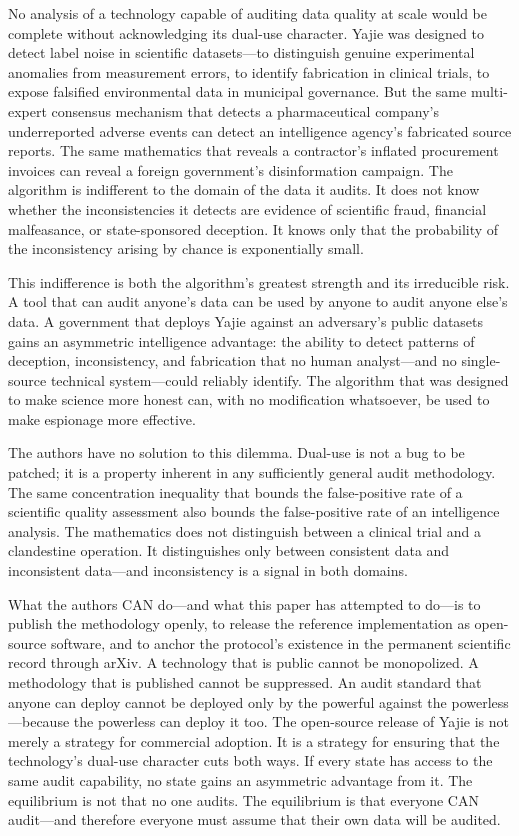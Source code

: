 \documentclass[12pt,a4paper]{article}
\theoremstyle{definition}
\theoremstyle{remark}
\begin{document}
No analysis of a technology capable of auditing data quality at scale would be complete without acknowledging its dual-use character. Yajie was designed to detect label noise in scientific datasets—to distinguish genuine experimental anomalies from measurement errors, to identify fabrication in clinical trials, to expose falsified environmental data in municipal governance. But the same multi-expert consensus mechanism that detects a pharmaceutical company's underreported adverse events can detect an intelligence agency's fabricated source reports. The same mathematics that reveals a contractor's inflated procurement invoices can reveal a foreign government's disinformation campaign. The algorithm is indifferent to the domain of the data it audits. It does not know whether the inconsistencies it detects are evidence of scientific fraud, financial malfeasance, or state-sponsored deception. It knows only that the probability of the inconsistency arising by chance is exponentially small.

This indifference is both the algorithm's greatest strength and its irreducible risk. A tool that can audit anyone's data can be used by anyone to audit anyone else's data. A government that deploys Yajie against an adversary's public datasets gains an asymmetric intelligence advantage: the ability to detect patterns of deception, inconsistency, and fabrication that no human analyst—and no single-source technical system—could reliably identify. The algorithm that was designed to make science more honest can, with no modification whatsoever, be used to make espionage more effective.

The authors have no solution to this dilemma. Dual-use is not a bug to be patched; it is a property inherent in any sufficiently general audit methodology. The same concentration inequality that bounds the false-positive rate of a scientific quality assessment also bounds the false-positive rate of an intelligence analysis. The mathematics does not distinguish between a clinical trial and a clandestine operation. It distinguishes only between consistent data and inconsistent data—and inconsistency is a signal in both domains.

What the authors CAN do—and what this paper has attempted to do—is to publish the methodology openly, to release the reference implementation as open-source software, and to anchor the protocol's existence in the permanent scientific record through arXiv. A technology that is public cannot be monopolized. A methodology that is published cannot be suppressed. An audit standard that anyone can deploy cannot be deployed only by the powerful against the powerless—because the powerless can deploy it too. The open-source release of Yajie is not merely a strategy for commercial adoption. It is a strategy for ensuring that the technology's dual-use character cuts both ways. If every state has access to the same audit capability, no state gains an asymmetric advantage from it. The equilibrium is not that no one audits. The equilibrium is that everyone CAN audit—and therefore everyone must assume that their own data will be audited.
\end{document}
